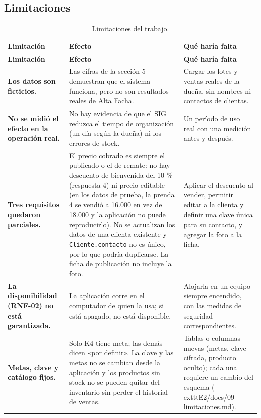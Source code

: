 \documentclass[11pt,letterpaper]{article}
\begin{document}
\subsection{Limitaciones}
{\footnotesize
\setlength{\tabcolsep}{3pt}\renewcommand{\arraystretch}{1.15}
\begin{longtable}{>{\raggedright\arraybackslash}p{}>{\raggedright\arraybackslash}p{}>{\raggedright\arraybackslash}p{}}
\caption{Limitaciones del trabajo.}\\
\hline
\rowcolor[HTML]{D9EAF7}\textbf{\textbf{Limitación}} & \textbf{\textbf{Efecto}} & \textbf{\textbf{Qué haría falta}} \\
\hline
\endfirsthead
\hline
\rowcolor[HTML]{D9EAF7}\textbf{\textbf{Limitación}} & \textbf{\textbf{Efecto}} & \textbf{\textbf{Qué haría falta}} \\
\hline
\endhead
\textbf{Los datos son ficticios.} & Las cifras de la sección 5 demuestran que el sistema funciona, pero no son resultados reales de Alta Facha. & Cargar los lotes y ventas reales de la dueña, sin nombres ni contactos de clientas. \\
\hline
\textbf{No se midió el efecto en la operación real.} & No hay evidencia de que el SIG reduzca el tiempo de organización (un día según la dueña) ni los errores de stock. & Un período de uso real con una medición antes y después. \\
\hline
\textbf{Tres requisitos quedaron parciales.} & El precio cobrado es siempre el publicado o el de remate: no hay descuento de bienvenida del 10 \% (respuesta 4) ni precio editable (en los datos de prueba, la prenda 4 se vendió a 16.000 en vez de 18.000 y la aplicación no puede reproducirlo). No se actualizan los datos de una clienta existente y \texttt{Cliente.contacto} no es único, por lo que podría duplicarse. La ficha de publicación no incluye la foto. & Aplicar el descuento al vender, permitir editar a la clienta y definir una clave única para su contacto, y agregar la foto a la ficha. \\
\hline
\textbf{La disponibilidad (RNF-02) no está garantizada.} & La aplicación corre en el computador de quien la usa; si está apagado, no está disponible. & Alojarla en un equipo siempre encendido, con las medidas de seguridad correspondientes. \\
\hline
\textbf{Metas, clave y catálogo fijos.} & Solo K4 tiene meta; las demás dicen «por definir». La clave y las metas no se cambian desde la aplicación y los productos sin stock no se pueden quitar del inventario sin perder el historial de ventas. & Tablas o columnas nuevas (metas, clave cifrada, producto oculto); cada una requiere un cambio del esquema (	exttt{E2/\allowbreak{}docs/\allowbreak{}09-limitaciones.md}). \\

\end{longtable}}
\end{document}
